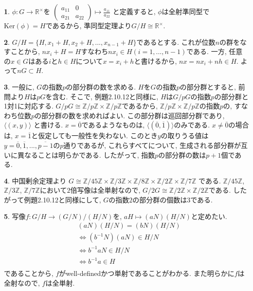 \documentclass{article}
\theoremstyle{definition}
\newtheorem{ans}{}
\numberwithin{ans}{subsection}
\newcommand{\Z}[1]{\mathbb{Z}/#1\mathbb{Z}}
\newcommand{\Ker}[1]{\mathrm{Ker}(#1)}
\begin{document}
\begin{ans}
  $\phi: G \rightarrow \mathbb{R}^\times$を
  $\begin{pmatrix}
    a_{11} & 0 \\
    a_{21} & a_{22}
  \end{pmatrix} \mapsto \frac{a_{11}}{a_{22}}$
  と定義すると, $\phi$は全射準同型で$\Ker{\phi} = H$であるから,
  準同型定理より$G/H \cong \mathbb{R}^\times$.
\end{ans}

\begin{ans}
  $G/H = \{H, x_1 + H, x_2 + H,..., x_{n-1} + H\}$であるとする.
  これが位数$n$の群をなすことから, $nx_i + H = H$すなわち$nx_i \in H (i = 1,..., n-1)$である.
  一方, 任意の$x \in G$はある$i$と$h \in H$について$x = x_i + h$と書けるから,
  $nx = nx_i + nh \in H$. よって$nG \subset H$.
\end{ans}

\begin{ans}
  一般に, $G$の指数$p$の部分群の数を求める.
  $H$を$G$の指数$p$の部分群とすると, 前問より$H$は$pG$を含む.
  そこで, 例題2.10.12と同様に, $H$は$G/pG$の指数$p$の部分群と1対1に対応する.
  $G/pG \cong \Z{p} \times \Z{p}$であるから,
  $\Z{p} \times \Z{p}$の指数$p$の, すなわち位数$p$の部分群の数を求めればよい.
  この部分群は巡回部分群であり, $\langle(x, y)\rangle$ と書ける.
  $x = \overline{0}$であるようなものは, $\langle(\overline{0}, \overline{1})\rangle$のみである.
  $x \neq \overline{0}$の場合は, $x = \overline{1}$と仮定しても一般性を失わない.
  このとき$y$の取りうる値は$y = \overline{0}, \overline{1},..., \overline{p-1}$の$p$通りであるが,
  これらすべてについて, 生成される部分群が互いに異なることは明らかである.
  したがって, 指数$p$の部分群の数は$p + 1$個である.
\end{ans}

\begin{ans}
  中国剰余定理より
  $G \cong \Z{45} \times \Z{3} \times \Z{8} \times \Z{2} \times \Z{7}$
  である. $\Z{45}$, $\Z{3}$, $\Z{7}$において$2$倍写像は全単射なので,
  $G/2G \cong \Z{2} \times \Z{2}$である.
  したがって例題2.10.12と同様にして, $G$の指数$2$の部分群の個数は$3$である.
\end{ans}

\begin{ans}
  写像$f: G/H \rightarrow (G/N)/(H/N)$を,
  $aH \mapsto (aN)(H/N)$と定めたい.
  \begin{align*}
    &(aN)(H/N) = (bN)(H/N) \\
    &\Leftrightarrow (b^{-1}N)(aN) \in H/N \\
    &\Leftrightarrow b^{-1}aN \in H/N \\
    &\Leftrightarrow b^{-1}a \in H \\
  \end{align*}
  であることから, $f$がwell-definedかつ単射であることがわかる.
  また明らかに$f$は全射なので, $f$は全単射.
\end{ans}
\end{document}
